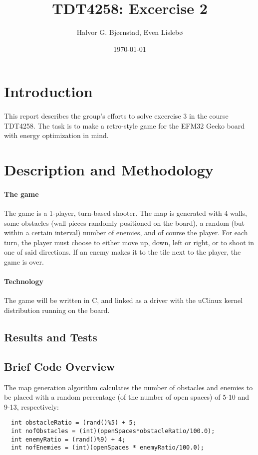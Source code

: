 \documentclass{article}
\title{TDT4258: Excercise 2}
\author{Halvor G. Bjørnstad, Even Lislebø}
\date{\today}
\begin{document}
\maketitle
\section*{Introduction}
\paragraph{}
This report describes the group's efforts to solve excercise 3 in the course TDT4258. The task is to make a retro-style game for the EFM32 Gecko board with energy optimization in mind.

\section*{Description and Methodology}
\paragraph{The game}
The game is a 1-player, turn-based shooter. The map is generated with 4 walls, some obstacles (wall pieces randomly positioned on the board), a random (but within a certain interval) number of enemies, and of course the player. For each turn, the player must choose to either move up, down, left or right, or to shoot in one of said directions. If an enemy makes it to the tile next to the player, the game is over.

\paragraph{Technology}
The game will be written in C, and linked as a driver with the uClinux kernel distribution running on the board.

\subsection*{Results and Tests}

\subsection*{Brief Code Overview}
The map generation algorithm calculates the number of obstacles and enemies to be placed with a random percentage (of the number of open spaces) of 5-10 and 9-13, respectively:
\begin{lstlisting}
  int obstacleRatio = (rand()%5) + 5;
  int nofObstacles = (int)(openSpaces*obstacleRatio/100.0);
  int enemyRatio = (rand()%9) + 4;
  int nofEnemies = (int)(openSpaces * enemyRatio/100.0);
\end{lstlisting}
\end{document}
